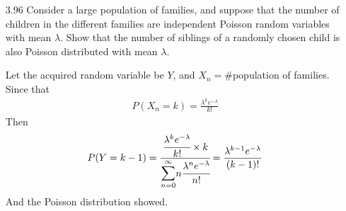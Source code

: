 \documentclass[en,hazy,blue,12pt,device = normal]{elegantnote}
\begin{document}
\begin{enumerate}
\begin{tcolorbox}
    \end{tcolorbox}

    \item[3.96]Consider a large population of families, and suppose that the number of children in the different families are independent Poisson random variables with mean \(\lambda\). Show that the number of siblings of a randomly chosen child is also Poisson distributed with mean \(\lambda\).
    
    \begin{tcolorbox}
        \sol

        Let the acquired random variable be \(Y\), and \(X_n = \#\)population of families. Since that 
        \begin{align*}
            P(X_n = k) = \frac{\lambda^k e^{-\lambda}}{k!}
        \end{align*}
        Then 
        \begin{align*}
            P(Y = k-1) = \cfrac{\cfrac{\lambda^k e^{-\lambda}}{k!}\times k}{\mathlarger{\mathlarger{\sum}}_{n = 0}^\infty n \cfrac{\lambda^n e^{-\lambda}}{n!}}
            = \frac{\lambda^{k-1} e^{-\lambda}}{(k-1)!}
        \end{align*}
        And the Poisson distribution showed.
    \end{tcolorbox}
\end{enumerate}
\end{document}
